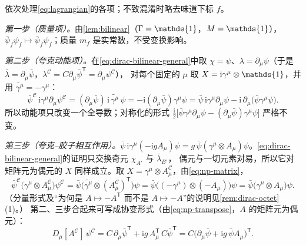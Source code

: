 \documentclass[UTF8,a4paper,11pt,fontset=fandol]{ctexart}
\makeatletter
\let\amsmathbb\mathbb
\renewcommand{\mathbb}[1]{\ifx1#1\mathds{1}\else\amsmathbb{#1}\fi}
\theoremstyle{cplain}
\theoremstyle{cdefinition}
\theoremstyle{cremark}
\renewcommand{\proofname}{证明}
\renewenvironment{proof}[1][\proofname]{\par\pushQED{\qed}\normalfont\topsep6\p@\@plus6\p@\relax
  \trivlist\item[\hskip\labelsep\itshape #1\hspace{0.5em}]\ignorespaces}{\popQED\endtrivlist\@endpefalse}
\numberwithin{equation}{section}
\newcommand{\tp}{\mathsf{T}}                         %
\newcommand{\Cop}{\mathcal{C}}                       %
\newcommand{\ii}{\mathrm{i}}                        %
\newcommand{\Cconj}[1]{\widetilde{#1}}              %
\makeatother
\begin{document}
\begin{proof}
依次处理\cref{eq:lagrangian}的各项；不致混淆时略去味道下标 $f$。

\emph{第一步（质量项）。}由\cref{lem:bilinear}（$\Gamma=\mathbb 1$，$M=\mathbb 1$），$\bar\psi_f\psi_f\mapsto\bar\psi_f\psi_f$；质量 $m_f$ 是实常数，不受变换影响。

\emph{第二步（夸克动能项）。}在\cref{eq:dirac-bilinear-general}中取 $\chi=\psi$、$\lambda=\partial_\mu\psi$（于是 $\bar\lambda=\partial_\mu\bar\psi$，$\lambda^{\Cop}=C\partial_\mu\bar\psi^{\tp}=\partial_\mu\psi^{\Cop}$），
对每个固定的 $\mu$ 取 $X=\ii\gamma^\mu\otimes\mathbb 1$，并用 $\Cconj{\gamma^\mu}=-\gamma^\mu$：
\begin{equation}\label{eq:np-kinetic}
\bar\psi^{\Cop}\,\ii\gamma^\mu\partial_\mu\psi^{\Cop}=(\partial_\mu\bar\psi)\,\ii\,\Cconj{\gamma^\mu}\,\psi=-\ii(\partial_\mu\bar\psi)\gamma^\mu\psi
=\bar\psi\,\ii\gamma^\mu\partial_\mu\psi-\ii\,\partial_\mu\bigl(\bar\psi\gamma^\mu\psi\bigr).
\end{equation}
所以动能项只改变一个全导数；对称化的形式 $\frac{\ii}{2}\bigl[\bar\psi\gamma^\mu\partial_\mu\psi-(\partial_\mu\bar\psi)\gamma^\mu\psi\bigr]$ 严格不变。

\emph{第三步（夸克--胶子相互作用）。}$\bar\psi\,\ii\gamma^\mu(-\ii gA_\mu)\psi=g\,\bar\psi(\gamma^\mu\otimes A_\mu)\psi$。\cref{eq:dirac-bilinear-general}的证明只交换奇元 $\chi_{A'}$ 与 $\bar\lambda_{B'}$，
偶元与一切元素对易，所以它对矩阵元为偶元的 $X$ 同样成立。取 $X=\gamma^\mu\otimes A^{\Cop}_\mu$，由\cref{eq:np-matrix}，
\begin{equation}\label{eq:np-qg}
\bar\psi^{\Cop}\bigl(\gamma^\mu\otimes A^{\Cop}_\mu\bigr)\psi^{\Cop}=\bar\psi\bigl(\Cconj{\gamma^\mu}\otimes(A^{\Cop}_\mu)^{\tp}\bigr)\psi
=\bar\psi\bigl((-\gamma^\mu)\otimes(-A_\mu)\bigr)\psi=\bar\psi\bigl(\gamma^\mu\otimes A_\mu\bigr)\psi .
\end{equation}
（分量形式及“为何是 $A\mapsto-A^{\tp}$ 而不是 $A\mapsto-A$”的说明见\cref{rem:dirac-octet}(1)。）
第二、三步合起来可写成协变形式（由\cref{eq:np-transpose}，$A$ 的矩阵元为偶元）：
\begin{equation}\label{eq:np-Dpsi}
D_\mu[A^{\Cop}]\,\psi^{\Cop}=C\,\partial_\mu\bar\psi^{\tp}+\ii g\,A^{\tp}_\mu\,C\bar\psi^{\tp}=C\bigl(\partial_\mu\bar\psi+\ii g\,\bar\psi A_\mu\bigr)^{\tp}.
\end{equation}


\end{proof}
\end{document}
